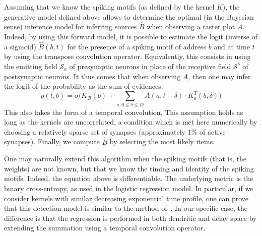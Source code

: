 \documentclass[runningheads]{llncs}
\newcommand{\presynaddr}{a} %
\newcommand{\postsynaddr}{b} %
\newcommand{\postsynaddrspace}{\mathcal{B}} %
\newcommand{\synapse}{\mathcal{S}} %
\newcommand{\synapticdelay}{\delta} %
\newcommand{\kernel}{K} %
\begin{document}
% 
Assuming that we know the spiking motifs (as defined by the kernel $\kernel$), the generative model defined above allows to determine the optimal (in the Bayesian sense) inference model for inferring sources $\hat{B}$ when observing a raster plot $A$. Indeed, by using this forward model, it is possible to estimate the logit (inverse of a sigmoid) $\hat{B}(b, t)$ for the presence of a spiking motif of address $b$ and at time $t$ by using the transpose convolution operator. Equivalently, this consists in using the emitting field $\synapse_\presynaddr$ of presynaptic neurons in place of the receptive field $\synapse^\postsynaddr$ of postsynaptic neurons. It thus comes that when observing $A$, then one may infer the logit of the probability as the sum of evidences:
\begin{equation*}
  p(t, \postsynaddr) = \sigma\big(\kernel_\postsynaddrspace(b) + \sum_{\presynaddr,  0 \le \synapticdelay \le D} A(\presynaddr, t-\synapticdelay) \cdot \kernel^T_\presynaddr(\postsynaddr, \synapticdelay) \big)  
\end{equation*}
This also takes the form of a temporal convolution. This assumption holds as long as the kernels are uncorrelated, a condition which is met here numerically by choosing a relatively sparse set of synapses (approximately $1\%$ of active synapses). Finally, we compute $\hat{B}$ by selecting the most likely items. 

One may naturally extend this algorithm when the spiking motifs (that is, the weights) are not known, but that we know the timing and identity of the spiking motifs. Indeed, the equation above is differentiable. 
The underlying metric is the binary cross-entropy, as used in the logistic regression model. In particular, if we consider kernels with similar decreasing exponential time profile, one can prove that this detection model is similar to the method of~\cite{berens_fast_2012}. In our specific case, the difference is that the regression is performed in both dendritic and delay space by extending the summation using a temporal convolution operator. 
\end{document}
